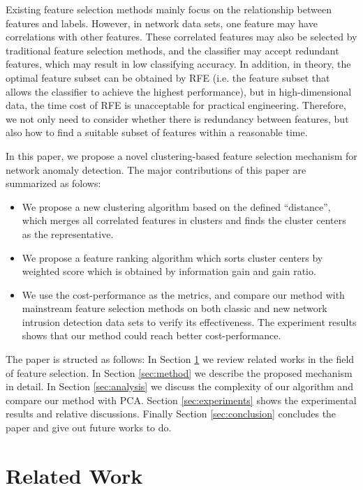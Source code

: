 \documentclass{ieeeaccess}
\theoremstyle{definition}
\begin{document}
Existing feature selection methods mainly focus on the relationship between features and labels. However, in network data sets, one feature may have correlations with other features. These correlated features may also be selected by traditional feature selection methods, and the classifier may accept redundant features, which may result in low classifying accuracy. In addition, in theory, the optimal feature subset can be obtained by RFE (i.e. the feature subset that allows the classifier to achieve the highest performance), but in high-dimensional data, the time cost of RFE is unacceptable for practical engineering. Therefore, we not only need to consider whether there is redundancy between features, but also how to find a suitable subset of features within a reasonable time.

In this paper, we propose a novel clustering-based feature selection mechanism for network anomaly detection.
The major contributions of this paper are summarized as folows:

\begin{itemize}
    \item We propose a new clustering algorithm based on the defined ``distance'', which merges all correlated features in clusters and finds the cluster centers as the representative.
    \item We propose a feature ranking algorithm which sorts cluster centers by weighted score which is obtained by information gain and gain ratio. 
    \item We use the cost-performance as the metrics, and compare our method with mainstream feature selection methods on both classic and new network intrusion detection data sets to verify its effectiveness. The experiment results shows that our method could reach better cost-performance.
\end{itemize}

The paper is structed as follows: In Section \ref{sec:related-work} we review related works in the field of feature selection. In Section \ref{sec:method} we describe the proposed mechanism in detail. In Section \ref{sec:analysis} we discuss the complexity of our algorithm and compare our method with PCA. Section \ref{sec:experiments} shows the experimental results and relative discussions. Finally Section \ref{sec:conclusion} concludes the paper and give out future works to do.

\section{Related Work}
\label{sec:related-work}
\end{document}
